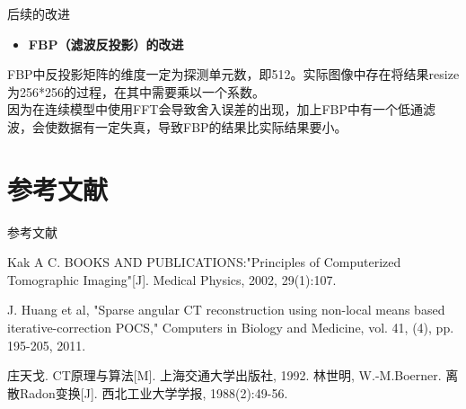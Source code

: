 \documentclass{beamer}
\begin{document}
	\begin{frame}{后续的改进}
		\begin{itemize}
			\item \textbf{FBP（滤波反投影）的改进}
		\end{itemize}


		\small FBP中反投影矩阵的维度一定为探测单元数，即512。实际图像中存在将结果resize为256*256的过程，在其中需要乘以一个系数。\\
		

		因为在连续模型中使用FFT会导致舍入误差的出现，加上FBP中有一个低通滤波，会使数据有一定失真，导致FBP的结果比实际结果要小。
	\end{frame}

\section{参考文献}
\begin{frame}{参考文献}
	\begin{thebibliography}{0}
		    
		Kak A C. BOOKS AND PUBLICATIONS:"Principles of Computerized Tomographic Imaging"[J]. Medical Physics, 2002, 29(1):107.
		    
		J. Huang et al, "Sparse angular CT reconstruction using non-local means based iterative-correction POCS," Computers in Biology and Medicine, vol. 41, (4), pp. 195-205, 2011.
		    
		庄天戈. CT原理与算法[M]. 上海交通大学出版社, 1992.
		林世明, W.-M.Boerner. 离散Radon变换[J]. 西北工业大学学报, 1988(2):49-56.
	\end{thebibliography}
\end{frame} %


\end{document}
